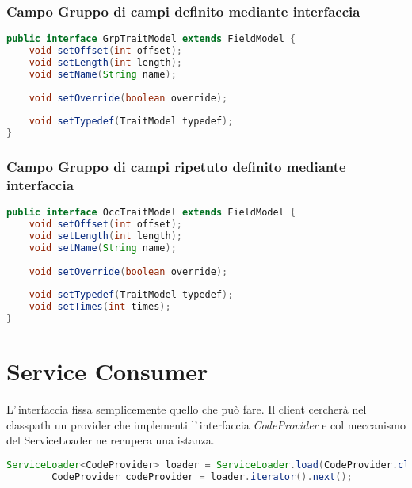 \documentclass[a4paper,10pt]{report}
\begin{document}
\subsection{Campo Gruppo di campi definito mediante interfaccia}

\begin{lstlisting}[language=java, caption=interfaccia GrpTraitModel, 
label=code:GrpTraitModel]
public interface GrpTraitModel extends FieldModel {
    void setOffset(int offset);
    void setLength(int length);
    void setName(String name);
    
    void setOverride(boolean override);
    
    void setTypedef(TraitModel typedef);
}
\end{lstlisting}

\subsection{Campo Gruppo di campi ripetuto definito mediante interfaccia}

\begin{lstlisting}[language=java, caption=interfaccia OccTraitModel, 
label=code:OccTraitModel]
public interface OccTraitModel extends FieldModel {
    void setOffset(int offset);
    void setLength(int length);
    void setName(String name);
    
    void setOverride(boolean override);
    
    void setTypedef(TraitModel typedef);
    void setTimes(int times);
}
\end{lstlisting}


\chapter{Service Consumer}
L'\,interfaccia fissa semplicemente quello che può fare.
Il client cercherà nel classpath un provider che implementi l'\,interfaccia
\textsl{CodeProvider} e col meccanismo del ServiceLoader ne recupera una istanza.

\begin{lstlisting}[language=java, caption=recupero del CodeProvider, 
label=code:getCodeProvider]
        ServiceLoader<CodeProvider> loader = ServiceLoader.load(CodeProvider.class);
        CodeProvider codeProvider = loader.iterator().next();
\end{lstlisting}
\end{document}
